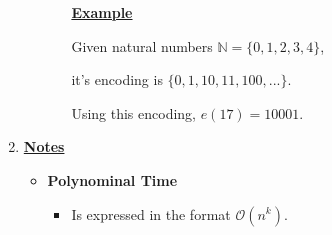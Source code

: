 \documentclass[12pt]{article}
\begin{document}
\begin{enumerate}[1.]
\begin{itemize}
\begin{itemize}
            \bigskip

            \underline{\textbf{Example}}

            \bigskip

            Given natural numbers $\mathbb{N} = \{0,1,2,3,4\}$,

            \bigskip

            it's encoding is $\{0,1,10,11,100, ...\}$.

            \bigskip

            Using this encoding, $e(17) = 10001$.

        \end{itemize}
    \end{itemize}

    \item

    \bigskip

    \underline{\textbf{Notes}}

    \begin{itemize}
        \item \textbf{Polynominal Time}

        \begin{itemize}
            \item Is expressed in the format $\mathcal{O}(n^k)$.
        \end{itemize}
    \end{itemize}

\end{enumerate}
\end{document}
